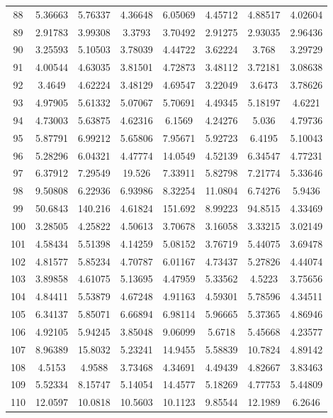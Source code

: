 \begin{center}
\begin{longtable}{cccccccc}
88 & 5.36663 & 5.76337 & 4.36648 & 6.05069 & 4.45712 & 4.88517 & 4.02604\\
89 & 2.91783 & 3.99308 & 3.3793 & 3.70492 & 2.91275 & 2.93035 & 2.96436\\
90 & 3.25593 & 5.10503 & 3.78039 & 4.44722 & 3.62224 & 3.768 & 3.29729\\
91 & 4.00544 & 4.63035 & 3.81501 & 4.72873 & 3.48112 & 3.72181 & 3.08638\\
92 & 3.4649 & 4.62224 & 3.48129 & 4.69547 & 3.22049 & 3.6473 & 3.78626\\
93 & 4.97905 & 5.61332 & 5.07067 & 5.70691 & 4.49345 & 5.18197 & 4.6221\\
94 & 4.73003 & 5.63875 & 4.62316 & 6.1569 & 4.24276 & 5.036 & 4.79736\\
95 & 5.87791 & 6.99212 & 5.65806 & 7.95671 & 5.92723 & 6.4195 & 5.10043\\
96 & 5.28296 & 6.04321 & 4.47774 & 14.0549 & 4.52139 & 6.34547 & 4.77231\\
97 & 6.37912 & 7.29549 & 19.526 & 7.33911 & 5.82798 & 7.21774 & 5.33646\\
98 & 9.50808 & 6.22936 & 6.93986 & 8.32254 & 11.0804 & 6.74276 & 5.9436\\
99 & 50.6843 & 140.216 & 4.61824 & 151.692 & 8.99223 & 94.8515 & 4.33469\\
100 & 3.28505 & 4.25822 & 4.50613 & 3.70678 & 3.16058 & 3.33215 & 3.02149\\
101 & 4.58434 & 5.51398 & 4.14259 & 5.08152 & 3.76719 & 5.44075 & 3.69478\\
102 & 4.81577 & 5.85234 & 4.70787 & 6.01167 & 4.73437 & 5.27826 & 4.44074\\
103 & 3.89858 & 4.61075 & 5.13695 & 4.47959 & 5.33562 & 4.5223 & 3.75656\\
104 & 4.84411 & 5.53879 & 4.67248 & 4.91163 & 4.59301 & 5.78596 & 4.34511\\
105 & 6.34137 & 5.85071 & 6.66894 & 6.98114 & 5.96665 & 5.37365 & 4.86946\\
106 & 4.92105 & 5.94245 & 3.85048 & 9.06099 & 5.6718 & 5.45668 & 4.23577\\
107 & 8.96389 & 15.8032 & 5.23241 & 14.9455 & 5.58839 & 10.7824 & 4.89142\\
108 & 4.5153 & 4.9588 & 3.73468 & 4.34691 & 4.49439 & 4.82667 & 3.83463\\
109 & 5.52334 & 8.15747 & 5.14054 & 14.4577 & 5.18269 & 4.77753 & 5.44809\\
110 & 12.0597 & 10.0818 & 10.5603 & 10.1123 & 9.85544 & 12.1989 & 6.2646\\

\end{longtable}
\end{center}
